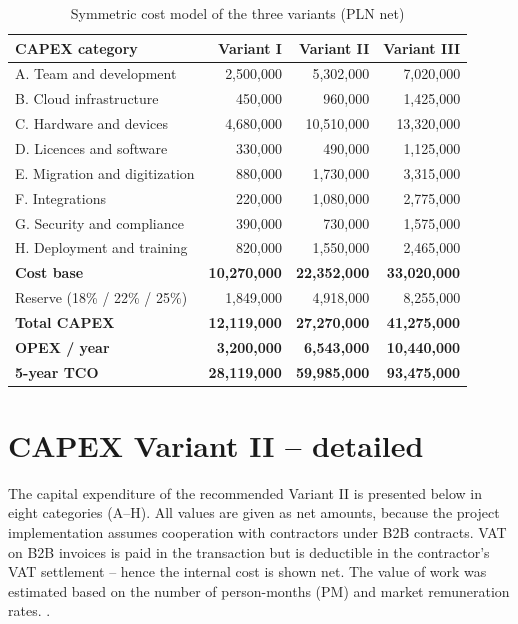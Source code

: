 \begin{table}[h]
\centering
\small
\renewcommand{\arraystretch}{1.2}
\begin{tabular}{|L{6.2cm}|r|r|r|}
\hline
{}\textbf{CAPEX category} & \textbf{Variant I} & \textbf{Variant II} & \textbf{Variant III} \\
\hline
A. Team and development & 2,500,000 & 5,302,000 & 7,020,000 \\
\hline
B. Cloud infrastructure & 450,000 & 960,000 & 1,425,000 \\
\hline
C. Hardware and devices & 4,680,000 & 10,510,000 & 13,320,000 \\
\hline
D. Licences and software & 330,000 & 490,000 & 1,125,000 \\
\hline
E. Migration and digitization & 880,000 & 1,730,000 & 3,315,000 \\
\hline
F. Integrations & 220,000 & 1,080,000 & 2,775,000 \\
\hline
G. Security and compliance & 390,000 & 730,000 & 1,575,000 \\
\hline
H. Deployment and training & 820,000 & 1,550,000 & 2,465,000 \\
\hline
{}\textbf{Cost base} & \textbf{10,270,000} & \textbf{22,352,000} & \textbf{33,020,000} \\
\hline
Reserve (18\% / 22\% / 25\%) & 1,849,000 & 4,918,000 & 8,255,000 \\
\hline
{}\textbf{Total CAPEX} & \textbf{12,119,000} & \textbf{27,270,000} & \textbf{41,275,000} \\
\hline
\textbf{OPEX / year} & \textbf{3,200,000} & \textbf{6,543,000} & \textbf{10,440,000} \\
\hline
{}\textbf{5-year TCO} & \textbf{28,119,000} & \textbf{59,985,000} & \textbf{93,475,000} \\
\hline
\end{tabular}
\caption{Symmetric cost model of the three variants (PLN net)}
\label{tab:trzy_warianty}
\end{table}

\section{CAPEX Variant II -- detailed}
\label{sec:capex_ii}

The capital expenditure of the recommended Variant II is presented below in eight categories (A--H). All values are given as net amounts, because the project implementation assumes cooperation with contractors under B2B contracts. VAT on B2B invoices is paid in the transaction but is deductible in the contractor's VAT settlement -- hence the internal cost is shown net. The value of work was estimated based on the number of person-months (PM) and market remuneration rates. \cite{Hays_2026, NoFluffJobs_2025}.

